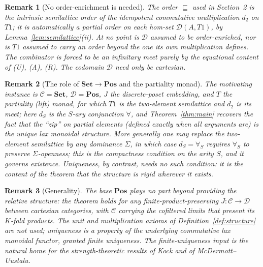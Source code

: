 \documentclass{article}
\newtheorem{remark}{Remark}
\newcommand{\C}{\mathcal{C}}
\newcommand{\D}{\mathcal{D}}
\newcommand{\Set}{\mathbf{Set}}
\newcommand{\Pos}{\mathbf{Pos}}
\begin{document}
\begin{remark}[No order-enrichment is needed]
The order $\sqsubseteq$ used in Section~2 is the intrinsic semilattice order of
the idempotent commutative multiplication $d_2$ on $T1$; it is automatically a
partial order on each hom-set $\D(A,T1)$, by Lemma~\ref{lem:semilattice}(ii).
At no point is $\D$ assumed to be order-enriched, nor is $T1$ assumed to carry an
order beyond the one its own multiplication defines. The combinator is forced to
be an infinitary meet purely by the equational content of (U), (A), (R). The
codomain $\D$ need only be cartesian.
\end{remark}

\begin{remark}[The role of $\Set\to\Pos$ and the partiality monad]
The motivating instance is $\C=\Set$, $\D=\Pos$, $J$ the discrete-poset
embedding, and $T$ the partiality (lift) monad, for which $T1$ is the
two-element semilattice and $d_2$ is its meet; here $d_S$ is the $S$-ary
conjunction $\forall$, and Theorem~\ref{thm:main} recovers the fact that the
``zip'' on partial elements (defined exactly when all arguments are) is the
unique lax monoidal structure. More generally one may replace the two-element
semilattice by any dominance $\Sigma$, in which case $d_S=\forall_S$ requires
$\forall_{S}$ to preserve $\Sigma$-openness; this is the \emph{compactness}
condition on the arity $S$, and it governs \emph{existence}. Uniqueness, by
contrast, needs no such condition: it is the content of the theorem that the
structure is rigid wherever it exists.
\end{remark}

\begin{remark}[Generality]
The base $\Pos$ plays no part beyond providing the relative structure: the
theorem holds for any finite-product-preserving $J\colon\C\to\D$ between
cartesian categories, with $\C$ carrying the cofiltered limits that present
its $K$-fold products. The unit and multiplication axioms of
Definition~\ref{def:structure} are not used; uniqueness is a property of the
underlying commutative lax monoidal functor, granted finite uniqueness. The
finite-uniqueness input is the natural home for the strength-theoretic results
of Kock and of McDermott--Uustalu.
\end{remark}
\end{document}
